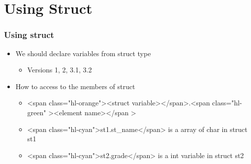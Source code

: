 \documentclass{../c-lecture}
\begin{document}
\section{Using Struct}

\begin{frame}
  \frametitle{Using struct}
  \begin{itemize}
    \item We should declare variables from struct type
    \begin{itemize}
      \item Versions 1, 2, 3.1, 3.2
    \end{itemize}
    \item How to access to the members of struct
    \begin{itemize}
      \item
        <span class="hl-orange"><struct variable></span>.<span
          class="hl-green"
          ><element name></span
        >

      \item
        <span class="hl-cyan">st1.st\_name</span> is a array of char in struct
        st1

      \item
        <span class="hl-cyan">st2.grade</span> is a int variable in struct st2

    \end{itemize}
  \end{itemize}
\end{frame}
\end{document}
